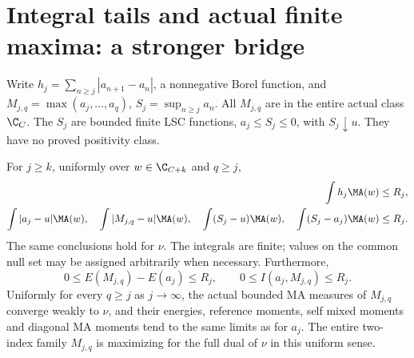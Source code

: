 \section{Integral tails and actual finite maxima: a stronger bridge}
Write $h_j=\sum_{n\ge j}|a_{n+1}-a_n|$, a nonnegative Borel function,
and $M_{j,q}=\max(a_j,\ldots,a_q)$, $S_j=\sup_{n\ge j}a_n$.
All $M_{j,q}$ are in the entire actual class $\C_C$. The $S_j$ are
bounded finite LSC functions, $a_j\le S_j\le0$, with $S_j\downarrow u$.
They have no proved positivity class.

\begin{theorem}\label{new:tails}
For $j\ge k$, uniformly over $w\in\C_{C+k}$ and $q\ge j$,
\begin{align}
 \int h_j\MA(w)&\le R_j,\label{new:variation}\\
 \int|a_j-u|\MA(w),\quad\int|M_{j,q}-u|\MA(w),\quad
 \int(S_j-u)\MA(w),\quad\int(S_j-a_j)\MA(w)&\le R_j.
 \label{new:alltails}
\end{align}
The same conclusions hold for $\nu$. The integrals are finite; values
on the common null set may be assigned arbitrarily when necessary.
Furthermore,
\begin{equation}\label{new:maximum}
 0\le E(M_{j,q})-E(a_j)\le R_j,
 \qquad 0\le I(a_j,M_{j,q})\le R_j.
\end{equation}
Uniformly for every $q\ge j$ as $j\to\infty$, the actual bounded
MA measures of $M_{j,q}$ converge weakly to $\nu$, and their energies,
reference moments, self mixed moments and diagonal MA moments tend to
the same limits as for $a_j$. The entire two-index family $M_{j,q}$
is maximizing for the full dual of $\nu$ in this uniform sense.
\end{theorem}
